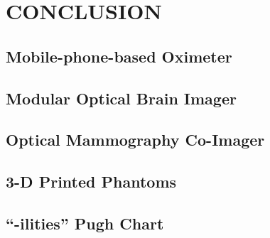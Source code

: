\chapter{CONCLUSION} %
\label{chap:conclude}



\section{Mobile-phone-based Oximeter}



\section{Modular Optical Brain Imager}



\section{Optical Mammography Co-Imager}



\section{3-D Printed Phantoms}



\section{``-ilities'' Pugh Chart}
